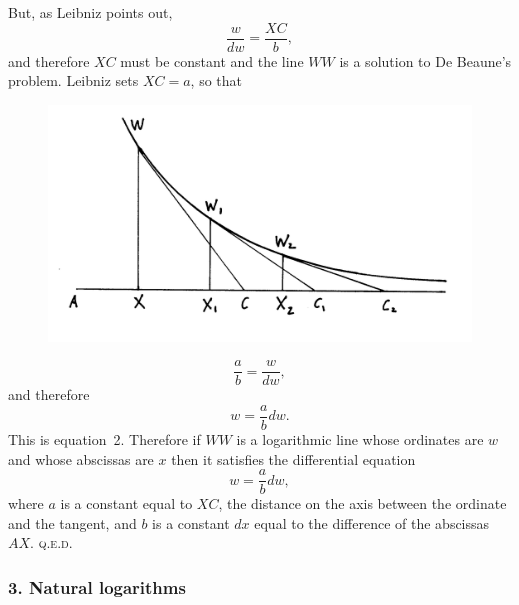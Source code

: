 \documentclass[twoside,openright]{article}
\begin{document}
But, as Leibniz points out,
$$\frac{w}{dw} = \frac{XC}{b},$$ and therefore $XC$ must be constant
and the line $WW$ is a solution to De Beaune's problem.  Leibniz sets
$XC =a$, so that 
 \begin{figure}[htp]
   \begin{center}
     \includegraphics[width=.85\textwidth]{fig/Figure26A}
     \caption{}
     \vspace{-10pt}
   \end{center}
\end{figure} 
$$\frac{a}{b} = \frac{w}{dw},$$
and therefore
$$w = \frac{a}{b}dw.$$
This is equation~2.  Therefore if $WW$ is a logarithmic line whose
ordinates are $w$ and whose abscissas are $x$ then it satisfies the
differential equation
$$w = \frac{a}{b}dw,$$
where $a$ is a constant equal to $XC$, the distance on the axis
between the ordinate and the tangent, and $b$ is a constant $dx$ equal
to the difference of the abscissas $AX$.  \textsc{q.e.d.}
\vspace{.5\baselineskip}


\subsubsection*{3. Natural logarithms}
\end{document}
